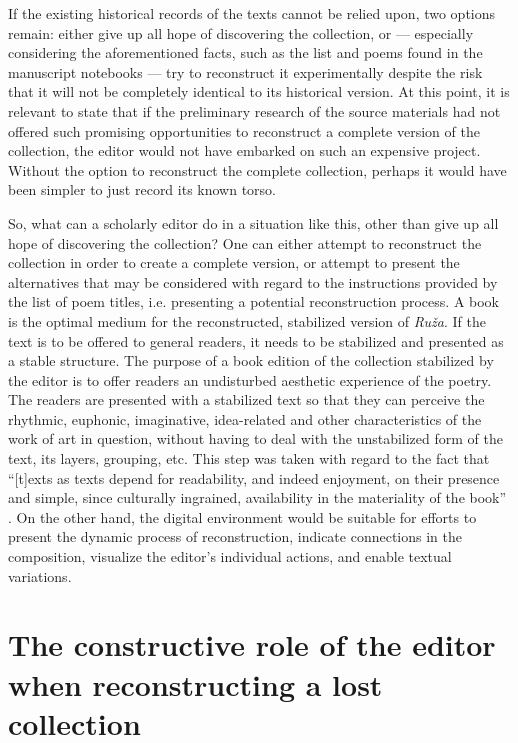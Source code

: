 \begin{paper}
If the existing historical records of the texts cannot be relied upon, two
options remain: either give up all hope of discovering the collection,
or –– especially considering the aforementioned facts, such as the list
and poems found in the manuscript notebooks –– try to reconstruct it
experimentally despite the risk that it will not be completely identical
to its historical version. At this point, it is relevant to state that
if the preliminary research of the source materials had not offered such
promising opportunities to reconstruct a complete version of the
collection, the editor would not have embarked on such an expensive
project. Without the option to reconstruct the complete collection,
perhaps it would have been simpler to just record its known torso.

So, what can a scholarly editor do in a situation like this, other than
give up all hope of discovering the collection? One can either attempt
to reconstruct the collection in order to create a complete version, or
attempt to present the alternatives that may be considered with regard
to the instructions provided by the list of poem titles, i.e. presenting
a potential reconstruction process. A book is the optimal medium for the
reconstructed, stabilized version of \emph{Ruža}. If the text is to be
offered to general readers, it needs to be stabilized and presented as
a stable structure. The purpose of a book edition of the collection
stabilized by the editor is to offer readers an undisturbed aesthetic
experience of the poetry. The readers are presented with a stabilized
text so that they can perceive the rhythmic, euphonic, imaginative,
idea-related and other characteristics of the work of art in question,
without having to deal with the unstabilized form of the text, its
layers, grouping, etc. This step was taken with regard to the fact that
``{[}t{]}exts as texts depend for readability, and indeed enjoyment, on
their presence and simple, since culturally ingrained, availability in
the materiality of the book'' \citep[XIV]{gabler_foreword_2016}. On the other hand, the
digital environment would be suitable for efforts to present the dynamic
process of reconstruction, indicate connections in the composition,
visualize the editor's individual actions, and enable textual variations.

\section{The constructive role of the editor when reconstructing a lost
collection}


\end{paper}
